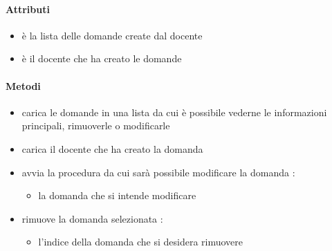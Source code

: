 \paragraph{Attributi}
\begin{itemize}
\item {}
\newline
è la lista delle domande create dal docente
\item {}
\newline
è il docente che ha creato le domande
\end{itemize}
\paragraph{Metodi}
\begin{itemize}
\item {}
\newline
carica le domande in una lista da cui è possibile vederne le informazioni principali, rimuoverle o modificarle
\newline
\item {}
\newline
carica il docente che ha creato la domanda
\newline
\item {}
\newline
avvia la procedura da cui sarà possibile modificare la domanda
\newline
{} :
\begin{itemize}
\item {}
\newline
la domanda che si intende modificare
\end{itemize}
\item {}
\newline
rimuove la domanda selezionata
\newline
{} :
\begin{itemize}
\item {}
\newline
l'indice della domanda che si desidera rimuovere
\end{itemize}
\end{itemize}
